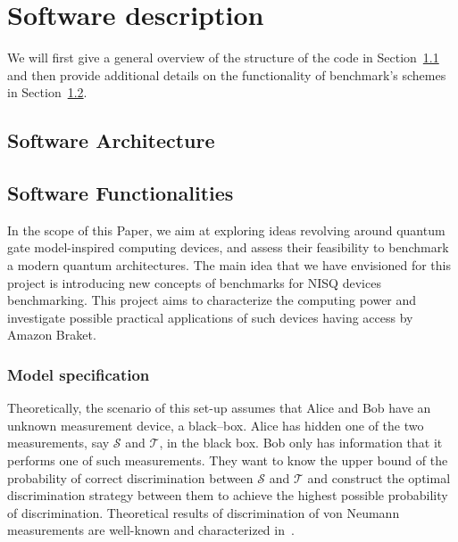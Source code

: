 \documentclass[preprint,12pt, a4paper]{elsarticle}
\newcommand{\1}{{\rm 1\hspace{-0.9mm}l}}
\newcommand{\TT}{\mathcal{T}}
\renewcommand{\SS}{\mathcal{S}}
\begin{document}
\section{Software description}
\label{}

We will first give a general overview of the structure of the code in 
Section~\ref{sec:sortware-architecture} and then provide additional details on 
the functionality of benchmark's schemes  in 
Section~\ref{sec:sortware-functionalities}.

\subsection{Software Architecture}\label{sec:sortware-architecture}
\label{}


\subsection{Software Functionalities}\label{sec:sortware-functionalities}

In the scope of this Paper, we aim at  exploring ideas revolving around quantum 
gate model-inspired computing devices, and assess their feasibility to 
benchmark a modern quantum architectures. The main idea that we have envisioned 
for this project is  introducing new concepts of benchmarks for NISQ devices 
benchmarking. This project aims to characterize the computing power and 
investigate possible practical applications of such devices having access by 
Amazon Braket. 





\subsubsection{Model specification}
Theoretically, the scenario of this set-up assumes that Alice and Bob have an 
unknown measurement device, a black--box. Alice has hidden one of the two 
measurements, say $\SS$ and $\TT$,  in the black box. Bob only has information that it 
performs one of such measurements. 
They want to know the upper bound of the   probability of correct discrimination between $\SS$ and $\TT$ and construct the optimal discrimination strategy between them to achieve the highest possible probability of discrimination. 
Theoretical results of discrimination of 
von Neumann measurements are well-known and characterized 
in~\cite{puchala2018strategies}.   
\end{document}
